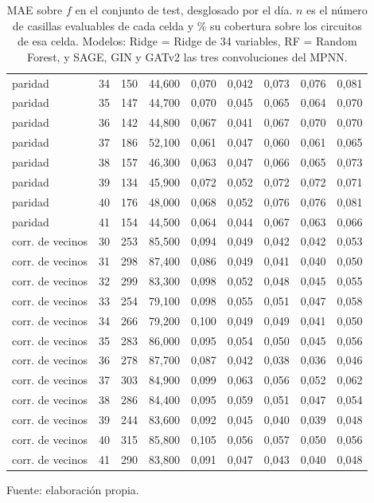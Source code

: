 \begin{table}[htbp]
{\begin{tabular}{@{}lrrrrrrrr@{}}
        paridad & 34 & 150 & 44,600 & 0,070 & 0,042 & 0,073 & 0,076 & 0,081 \\
        paridad & 35 & 147 & 44,700 & 0,070 & 0,045 & 0,065 & 0,064 & 0,070 \\
        paridad & 36 & 142 & 44,800 & 0,067 & 0,041 & 0,067 & 0,070 & 0,070 \\
        paridad & 37 & 186 & 52,100 & 0,061 & 0,047 & 0,060 & 0,061 & 0,065 \\
        paridad & 38 & 157 & 46,300 & 0,063 & 0,047 & 0,066 & 0,065 & 0,073 \\
        paridad & 39 & 134 & 45,900 & 0,072 & 0,052 & 0,072 & 0,072 & 0,071 \\
        paridad & 40 & 176 & 48,000 & 0,068 & 0,052 & 0,076 & 0,076 & 0,081 \\
        paridad & 41 & 154 & 44,500 & 0,064 & 0,044 & 0,067 & 0,063 & 0,066 \\
        corr. de vecinos & 30 & 253 & 85,500 & 0,094 & 0,049 & 0,042 & 0,042 & 0,053 \\
        corr. de vecinos & 31 & 298 & 87,400 & 0,086 & 0,049 & 0,041 & 0,040 & 0,050 \\
        corr. de vecinos & 32 & 299 & 83,300 & 0,098 & 0,052 & 0,048 & 0,045 & 0,055 \\
        corr. de vecinos & 33 & 254 & 79,100 & 0,098 & 0,055 & 0,051 & 0,047 & 0,058 \\
        corr. de vecinos & 34 & 266 & 79,200 & 0,100 & 0,049 & 0,049 & 0,041 & 0,050 \\
        corr. de vecinos & 35 & 283 & 86,000 & 0,095 & 0,054 & 0,050 & 0,045 & 0,056 \\
        corr. de vecinos & 36 & 278 & 87,700 & 0,087 & 0,042 & 0,038 & 0,036 & 0,046 \\
        corr. de vecinos & 37 & 303 & 84,900 & 0,099 & 0,063 & 0,056 & 0,052 & 0,062 \\
        corr. de vecinos & 38 & 286 & 84,400 & 0,095 & 0,059 & 0,051 & 0,047 & 0,054 \\
        corr. de vecinos & 39 & 244 & 83,600 & 0,092 & 0,045 & 0,040 & 0,039 & 0,048 \\
        corr. de vecinos & 40 & 315 & 85,800 & 0,105 & 0,056 & 0,057 & 0,050 & 0,056 \\
        corr. de vecinos & 41 & 290 & 83,800 & 0,091 & 0,047 & 0,043 & 0,040 & 0,048 \\
        \bottomrule
    \end{tabular}}

    \caption{MAE sobre $f$ en el conjunto de test, desglosado por el día. $n$ es el número de casillas evaluables de cada celda y \% su cobertura sobre los circuitos de esa celda. Modelos: Ridge = Ridge de 34 variables, RF = Random Forest, y SAGE, GIN y GATv2 las tres convoluciones del MPNN.}
    \label{tab:v2_tiempo_mae_f}

    {\footnotesize Fuente: elaboración propia.}
\end{table}
